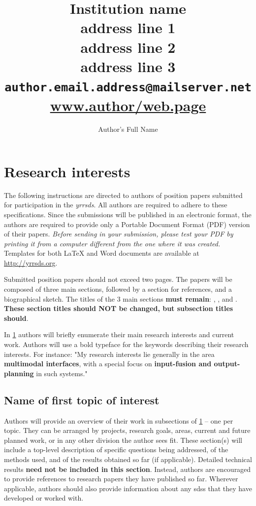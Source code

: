 \documentclass[10pt, a4paper]{article}
\author{Author's Full Name}
\title{
	Institution name\\
	address line 1\\
	address line 2\\
	address line 3\\[0.2cm]
	\texttt{author.email.address@mailserver.net}\\
	\small\url{www.author/web.page}
}
\date{}
\begin{document}
\maketitle


\section{Research interests}
\label{sec:research_interests}

The following instructions are directed to authors of position papers submitted
for participation in the \textit{\ac{yrrsds}}.
All authors are required to adhere to these specifications.
Since the submissions will be published in an electronic format, the authors are required to provide only a Portable Document
Format (PDF) version of their papers.
{\em Before sending in your submission, please test your PDF by printing it from a computer different from the one where it
was created.}
Templates for both LaTeX and Word documents are available at \url{http://yrrsds.org}.

Submitted position papers should not exceed two pages.
The papers will be composed of three main sections, followed by a section for references, and a biographical sketch.
The titles of the 3 main sections \textbf{must remain}:
, , and .
\textbf{These section titles should NOT be changed, but subsection titles should}.

In \cref{sec:research_interests} authors will briefly enumerate their main research interests and current work.
Authors will use a bold typeface for the keywords describing their research interests. For instance: "My research interests lie generally in the area {\bf multimodal interfaces}, with a special focus on {\bf input-fusion and output-planning} in such systems." 

\subsection{Name of first topic of interest}
\label{subsec:first_topic_of_interest}

Authors will provide an overview of their work in subsections of \cref{sec:research_interests} -- one per topic.
They can be arranged by projects, research goals, areas, current and future planned work, or in any other division the author sees fit.
These section(s) will include a top-level description of specific questions being addressed, of the methods used, and of the results obtained so far (if applicable).
Detailed technical results {\bf need not be included in this section}.
Instead, authors are encouraged to provide references to research papers they have published so far.
Wherever applicable, authors should also provide information about any \acp{sds} that they have developed or worked with.
\end{document}
